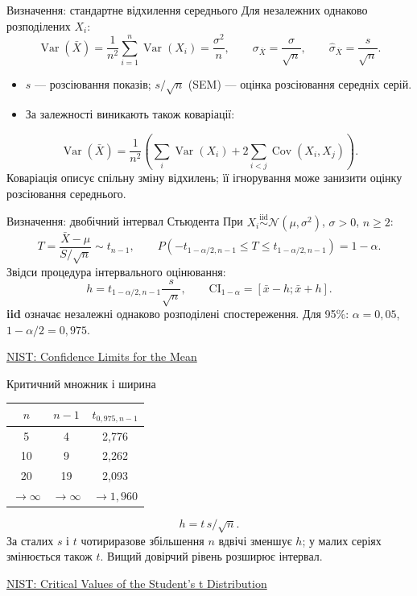 \documentclass[aspectratio=169,11pt]{beamer}
\newcommand{\src}[2]{\par\vfill{\tiny\href{#1}{#2}}}
\newcommand{\Var}{\operatorname{Var}}
\begin{document}
\begin{frame}{Визначення: стандартне відхилення середнього}
Для незалежних однаково розподілених $X_i$:
\[
\Var(\bar X)=\frac1{n^2}\sum_{i=1}^n\Var(X_i)
=\frac{\sigma^2}{n},\qquad
\sigma_{\bar X}=\frac\sigma{\sqrt n},\qquad
\widehat{\sigma}_{\bar X}=\frac s{\sqrt n}.
\]
\begin{itemize}
\item $s$ — розсіювання показів; $s/\sqrt n$ (SEM) — оцінка розсіювання середніх серій.
\item За залежності виникають також коваріації:
\end{itemize}
\[
\Var(\bar X)=\frac1{n^2}\left(\sum_i\Var(X_i)+2\sum_{i<j}\operatorname{Cov}(X_i,X_j)\right).
\]
Коваріація описує спільну зміну відхилень; її ігнорування може занизити оцінку розсіювання середнього.
\end{frame}

\begin{frame}{Визначення: двобічний інтервал Стьюдента}
При $X_i\overset{\mathrm{iid}}\sim\mathcal N(\mu,\sigma^2)$, $\sigma>0$, $n\ge2$:
\[
T=\frac{\bar X-\mu}{S/\sqrt n}\sim t_{n-1},\qquad
P\!\left(-t_{1-\alpha/2,n-1}\le T\le t_{1-\alpha/2,n-1}\right)=1-\alpha.
\]
Звідси процедура інтервального оцінювання:
\[
h=t_{1-\alpha/2,n-1}\frac{s}{\sqrt n},\qquad
\mathrm{CI}_{1-\alpha}=[\bar x-h;\bar x+h].
\]
\textbf{iid} означає незалежні однаково розподілені спостереження. Для 95\%: $\alpha=0{,}05$, $1-\alpha/2=0{,}975$.
\src{https://www.itl.nist.gov/div898/handbook/eda/section3/eda352.htm}{NIST: Confidence Limits for the Mean}
\end{frame}

\begin{frame}{Критичний множник і ширина}
\begin{center}
\begin{tabular}{ccc}
\toprule
$n$ & $n-1$ & $t_{0{,}975,n-1}$\\\midrule
5 & 4 & 2,776\\
10 & 9 & 2,262\\
20 & 19 & 2,093\\
$\to\infty$ & $\to\infty$ & $\to1{,}960$\\\bottomrule
\end{tabular}
\end{center}
\[
h=t\,s/\sqrt n.
\]
За сталих $s$ і $t$ чотириразове збільшення $n$ вдвічі зменшує $h$; у малих серіях змінюється також $t$. Вищий довірчий рівень розширює інтервал.
\src{https://www.itl.nist.gov/div898/handbook/eda/section3/eda3672.htm}{NIST: Critical Values of the Student's t Distribution}
\end{frame}
\end{document}
